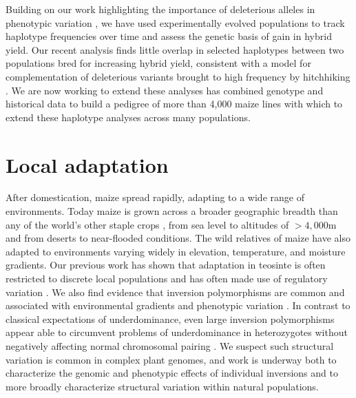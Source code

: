 \documentclass[11pt,letterpaper]{article}
\begin{document}
Building on our work highlighting the importance of deleterious alleles in phenotypic variation \citep{mezmouk2014pattern}, we have used experimentally evolved populations to track haplotype frequencies over time and assess the genetic basis of gain in hybrid yield. 
Our recent analysis finds little overlap in selected haplotypes between two populations bred for increasing hybrid yield, consistent with a model for complementation of deleterious variants brought to high frequency by hitchhiking  \citep{gerke2013genomic}. 
We are now working to extend these analyses has combined genotype and historical data to build a pedigree of more than 4,000 maize lines with which to extend these haplotype analyses across many populations.  

\section*{Local adaptation} %

After domestication, maize spread rapidly, adapting to a wide range of environments. 
Today maize is grown across a broader geographic breadth than any of the world's other staple crops \citep{hake2015genetic}, from sea level to altitudes of $>4,000$m and from deserts to near-flooded conditions.
The wild relatives of maize have also adapted to environments varying widely in elevation, temperature, and moisture gradients. 
Our previous work has shown that adaptation in teosinte is often restricted to discrete local populations and has often made use of regulatory variation \citep{pyhajarvi2013complex}.
We also find evidence that inversion polymorphisms are common and associated with environmental gradients and phenotypic variation \cite{pyhajarvi2013complex,fang2012megabase}.
In contrast to classical expectations of underdominance, even large inversion polymorphisms appear able to circumvent problems of underdominance in heterozygotes without negatively affecting normal chromosomal pairing \citep{maguire1966relationship}.
We suspect such structural variation is common in complex plant genomes, and work is underway both to characterize the genomic and phenotypic effects of individual inversions and to more broadly characterize structural variation within natural populations.
\end{document}
